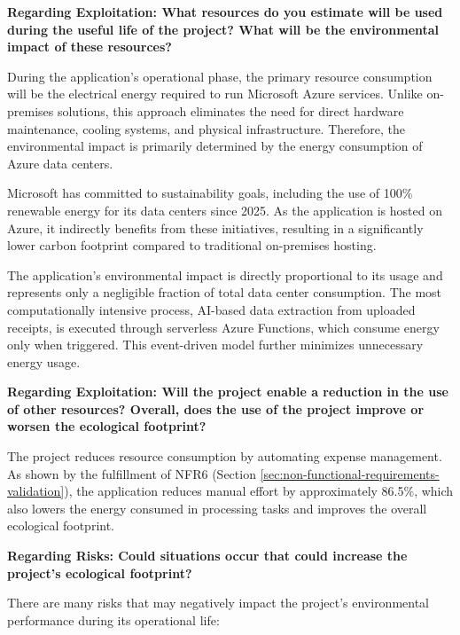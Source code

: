 \textbf{Regarding Exploitation: What resources do you estimate will be used during the useful life of the project? What will be the environmental impact of these resources?}

During the application's operational phase, the primary resource consumption will be the electrical energy required to run Microsoft Azure services. Unlike on-premises solutions, this approach eliminates the need for direct hardware maintenance, cooling systems, and physical infrastructure. Therefore, the environmental impact is primarily determined by the energy consumption of Azure data centers.

Microsoft has committed to sustainability goals, including the use of 100\% renewable energy for its data centers since 2025. \cite{microsoft-renewable-energy-goal} As the application is hosted on Azure, it indirectly benefits from these initiatives, resulting in a significantly lower carbon footprint compared to traditional on-premises hosting.

The application's environmental impact is directly proportional to its usage and represents only a negligible fraction of total data center consumption. The most computationally intensive process, AI-based data extraction from uploaded receipts, is executed through serverless Azure Functions, which consume energy only when triggered. This event-driven model further minimizes unnecessary energy usage.

\textbf{Regarding Exploitation: Will the project enable a reduction in the use of other resources? Overall, does the use of the project improve or worsen the ecological footprint?}

The project reduces resource consumption by automating expense management. As shown by the fulfillment of NFR6 (Section \ref{sec:non-functional-requirements-validation}), the application reduces manual effort by approximately 86.5\%, which also lowers the energy consumed in processing tasks and improves the overall ecological footprint.

\textbf{Regarding Risks: Could situations occur that could increase the project's ecological footprint?}

There are many risks that may negatively impact the project's environmental performance during its operational life:

